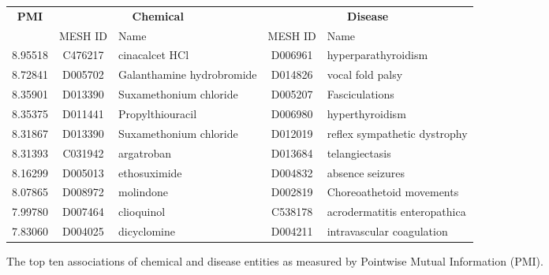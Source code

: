 \documentclass[10pt, oneside]{article}
\begin{document}
\begin{figure}[h]
\begin{center}
\fontsize{9}{11}\selectfont
\begin{tabular}{|*{2}{c|}p{4.5cm}|c|p{4.5cm}|}\hline
 \multirow{2}{*}{\textbf{PMI}} & \multicolumn{2}{c|}{\textbf{Chemical}} & \multicolumn{2}{c|}{\textbf{Disease}} \\ \cline{2-5}
 & MESH ID   & Name                      & MESH ID   & Name                         \\ \hline
 8.95518 & C476217   & cinacalcet HCl            & D006961   & hyperparathyroidism          \\ \hline
 8.72841 & D005702   & Galanthamine hydrobromide & D014826   & vocal fold palsy             \\ \hline
 8.35901 & D013390   & Suxamethonium chloride    & D005207   & Fasciculations               \\ \hline
 8.35375 & D011441   & Propylthiouracil          & D006980   & hyperthyroidism              \\ \hline
 8.31867 & D013390   & Suxamethonium chloride    & D012019   & reflex sympathetic dystrophy \\ \hline
 8.31393 & C031942   & argatroban                & D013684   & telangiectasis               \\ \hline
 8.16299 & D005013   & ethosuximide              & D004832   & absence seizures             \\ \hline
 8.07865 & D008972   & molindone                 & D002819   & Choreoathetoid movements     \\ \hline
 7.99780 & D007464   & clioquinol                & C538178   & acrodermatitis enteropathica \\ \hline
 7.83060 & D004025   & dicyclomine               & D004211   & intravascular coagulation    \\ \hline
\end{tabular}
\caption{\label{fig:pmi} The top ten associations of chemical and disease entities as measured by Pointwise Mutual Information (PMI).}
\end{center}
\end{figure}
\end{document}
